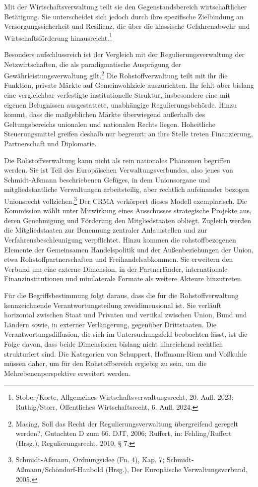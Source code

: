\documentclass[12pt,a4paper,oneside]{book} %
\begin{document}
{	Mit der Wirtschaftsverwaltung teilt sie den Gegenstandsbereich wirtschaftlicher Betätigung. Sie unterscheidet sich jedoch durch ihre spezifische Zielbindung an Versorgungssicherheit und Resilienz, die über die klassische Gefahrenabwehr und Wirtschaftsförderung hinausreicht.\footnote{Stober/Korte, Allgemeines Wirtschaftsverwaltungsrecht, 20. Aufl. 2023; Ruthig/Storr, Öffentliches Wirtschaftsrecht, 6. Aufl. 2024.}
	
	Besonders aufschlussreich ist der Vergleich mit der Regulierungsverwaltung der Netzwirtschaften, die als paradigmatische Ausprägung der Gewährleistungsverwaltung gilt.\footnote{Masing, Soll das Recht der Regulierungsverwaltung übergreifend geregelt werden?, Gutachten D zum 66. DJT, 2006; Ruffert, in: Fehling/Ruffert (Hrsg.), Regulierungsrecht, 2010, § 7.} Die Rohstoffverwaltung teilt mit ihr die Funktion, private Märkte auf Gemeinwohlziele auszurichten. Ihr fehlt aber bislang eine vergleichbar verfestigte institutionelle Struktur, insbesondere eine mit eigenen Befugnissen ausgestattete, unabhängige Regulierungsbehörde. Hinzu kommt, dass die maßgeblichen Märkte überwiegend außerhalb des Geltungsbereichs unionalen und nationalen Rechts liegen. Hoheitliche Steuerungsmittel greifen deshalb nur begrenzt; an ihre Stelle treten Finanzierung, Partnerschaft und Diplomatie.
	
	Die Rohstoffverwaltung kann nicht als rein nationales Phänomen begriffen werden. Sie ist Teil des Europäischen Verwaltungsverbundes, also jenes von Schmidt-Aßmann beschriebenen Gefüges, in dem Unionsorgane und mitgliedstaatliche Verwaltungen arbeitsteilig, aber rechtlich aufeinander bezogen Unionsrecht vollziehen.\footnote{Schmidt-Aßmann, Ordnungsidee (Fn. 4), Kap. 7; Schmidt-Aßmann/Schöndorf-Haubold (Hrsg.), Der Europäische Verwaltungsverbund, 2005.} Der CRMA verkörpert dieses Modell exemplarisch. Die Kommission wählt unter Mitwirkung eines Ausschusses strategische Projekte aus, deren Genehmigung und Förderung den Mitgliedstaaten obliegt. Zugleich werden die Mitgliedstaaten zur Benennung zentraler Anlaufstellen und zur Verfahrensbeschleunigung verpflichtet. Hinzu kommen die rohstoffbezogenen Elemente der Gemeinsamen Handelspolitik und der Außenbeziehungen der Union, etwa Rohstoffpartnerschaften und Freihandelsabkommen. Sie erweitern den Verbund um eine externe Dimension, in der Partnerländer, internationale Finanzinstitutionen und minilaterale Formate als weitere Akteure hinzutreten.
	
	Für die Begriffsbestimmung folgt daraus, dass die für die Rohstoffverwaltung kennzeichnende Verantwortungsteilung zweidimensional ist. Sie verläuft horizontal zwischen Staat und Privaten und vertikal zwischen Union, Bund und Ländern sowie, in externer Verlängerung, gegenüber Drittstaaten. Die Verantwortungsdiffusion, die sich im Untersuchungsfeld beobachten lässt, ist die Folge davon, dass beide Dimensionen bislang nicht hinreichend rechtlich strukturiert sind. Die Kategorien von Schuppert, Hoffmann-Riem und Voßkuhle müssen daher, um für den Rohstoffbereich ergiebig zu sein, um die Mehrebenenperspektive erweitert werden.
	
}
\end{document}

